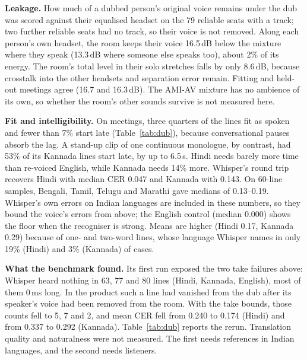 \textbf{Leakage.} How much of a dubbed person's original voice remains under the dub was scored against their equalised headset on the 79 reliable seats with a track; two further reliable seats had no track, so their voice is not removed. Along each person's own headset, the room keeps their voice 16.5\,dB below the mixture where they speak (13.3\,dB where someone else speaks too), about 2\% of its energy. The room's total level in their solo stretches falls by only 8.6\,dB, because crosstalk into the other headsets and separation error remain. Fitting and held-out meetings agree (16.7 and 16.3\,dB). The AMI-AV mixture has no ambience of its own, so whether the room's other sounds survive is not measured here.

\textbf{Fit and intelligibility.} On meetings, three quarters of the lines fit as spoken and fewer than 7\% start late (Table~\ref{tab:dub}), because conversational pauses absorb the lag. A stand-up clip of one continuous monologue, by contrast, had 53\% of its Kannada lines start late, by up to 6.5\,s. Hindi needs barely more time than re-voiced English, while Kannada needs 14\% more. Whisper's round trip recovers Hindi with median CER 0.047 and Kannada with 0.143. On 60-line samples, Bengali, Tamil, Telugu and Marathi gave medians of 0.13--0.19. Whisper's own errors on Indian languages are included in these numbers, so they bound the voice's errors from above; the English control (median 0.000) shows the floor when the recogniser is strong. Means are higher (Hindi 0.17, Kannada 0.29) because of one- and two-word lines, whose language Whisper names in only 19\% (Hindi) and 3\% (Kannada) of cases.

\textbf{What the benchmark found.} Its first run exposed the two take failures above: Whisper heard nothing in 63, 77 and 80 lines (Hindi, Kannada, English), most of them 0\,ms long. In the product such a line had vanished from the dub after its speaker's voice had been removed from the room. With the take bounds, those counts fell to 5, 7 and 2, and mean CER fell from 0.240 to 0.174 (Hindi) and from 0.337 to 0.292 (Kannada). Table~\ref{tab:dub} reports the rerun. Translation quality and naturalness were not measured. The first needs references in Indian languages, and the second needs listeners.

